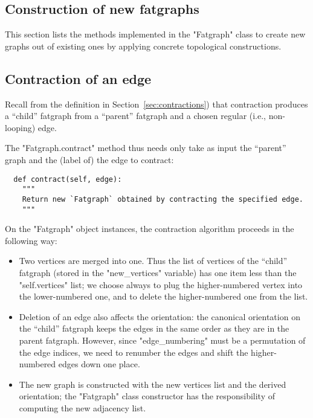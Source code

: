 \subsection{Construction of new fatgraphs}
\label{sec:construction}

This section lists the methods implemented in the "Fatgraph" class to
create new graphs out of existing ones by applying concrete
topological constructions.

\subsection{Contraction of an edge}
\label{sec:contract}

Recall from the definition in Section~\ref{sec:contractions}) that
contraction produces a ``child'' fatgraph from a ``parent'' fatgraph
and a chosen regular (i.e., non-looping) edge. 

The "Fatgraph.contract" method thus needs only take as input the ``parent''
graph and the (label of) the edge to contract:
\begin{lstlisting}
  def contract(self, edge):
    """
    Return new `Fatgraph` obtained by contracting the specified edge.
    """

\end{lstlisting}

On the "Fatgraph" object instances, the contraction algorithm
proceeds in the following way:
\begin{itemize}
\item Two vertices are merged into one. Thus the list of vertices of
  the ``child'' fatgraph (stored in the "new_vertices" variable) has
  one item less than the "self.vertices" list; we choose always to
  plug the higher-numbered vertex into the lower-numbered one, and to
  delete the higher-numbered one from the list.
\item Deletion of an edge also affects the orientation: the canonical
  orientation on the ``child'' fatgraph keeps the edges in the same
  order as they are in the parent fatgraph.  However, since
  "edge_numbering" must be a permutation of the edge indices, we need
  to renumber the edges and shift the higher-numbered edges down one
  place.
\item The new graph is constructed with the new vertices list and the
  derived orientation; the "Fatgraph" class constructor has the
  responsibility of computing the new adjacency list. 
\end{itemize}

